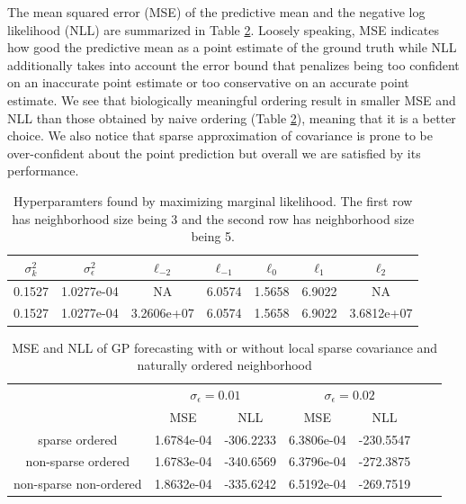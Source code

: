 \documentclass[smallextended,natbib]{svjour3}       %
\begin{document}
The mean squared error (MSE) of the predictive mean and the negative log likelihood (NLL) are summarized in Table \ref{tab:MSE-and-NLL}. Loosely speaking, MSE indicates how good the predictive mean as a point estimate of the ground truth while NLL additionally takes into account the error bound that penalizes being too confident on an inaccurate point estimate or too conservative on an accurate point estimate. We see that biologically meaningful ordering result in smaller MSE and NLL than those obtained by naive ordering (Table \ref{tab:MSE-and-NLL}), meaning that it is a better choice. We also notice that sparse approximation of covariance is prone to be over-confident about the point prediction but overall we are satisfied by its performance. 

\begin{table}[h]
\begin{center}
\caption{Hyperparamters found by maximizing marginal likelihood. The first row has neighborhood size being 3 and the second row has neighborhood size being 5.}
\label{tab:length scales}
\begin{tabular}{ccccccc} \hline
 $\sigma_{k}^{2}$ & $\sigma_{\epsilon}^{2}$ & $\ell_{-2}$ & $\ell_{-1}$ & $\ell_{0}$ & $\ell_{1}$ & $\ell_{2}$ \\ \hline
0.1527 & 1.0277e-04 & NA & 6.0574 & 1.5658 & 6.9022 & NA\\ 
0.1527 & 1.0277e-04 & 3.2606e+07 & 6.0574 & 1.5658 & 6.9022 & 3.6812e+07\\ \hline
\end{tabular}
\end{center}
\end{table}


\begin{table}[h]
\begin{center}
\caption[MSE and NLL of GP Forecasting with or without Local Sparse Covariance and Naturally Ordered Neighborhood] {MSE and NLL of GP forecasting with or without local sparse covariance and naturally ordered neighborhood}
\label{tab:MSE-and-NLL}
\begin{tabular}{ccccccc} \hline
\multirow{2}{*}{} & \multicolumn{2}{c}{$\sigma_{\epsilon}=0.01$} & \multicolumn{2}{c}{$\sigma_{\epsilon}=0.02$} \\
\cmidrule{2-5} \cmidrule{3-5} \cmidrule{4-5} \cmidrule{5-5} 
 & MSE & NLL & MSE & NLL\\ \hline
sparse ordered & 1.6784e-04 & -306.2233 & 6.3806e-04 & -230.5547 \\
non-sparse ordered & 1.6783e-04 & -340.6569 & 6.3796e-04 & -272.3875 \\
non-sparse non-ordered & 1.8632e-04 & -335.6242 & 6.5192e-04 & -269.7519 \\ \hline
\end{tabular}
\end{center}
\end{table}
\end{document}
